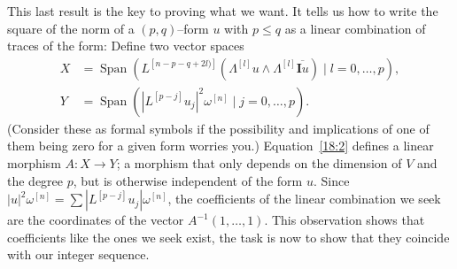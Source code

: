 \documentclass[11pt,a4paper]{amsart}
\def\^#1{^{[#1]}}
\def\I{\mathbf{I}}
\theoremstyle{definition}
\theoremstyle{remark}
\numberwithin{equation}{section}
\begin{document}
This last result is the key to proving what we want. It tells us how to
write the square of the norm of a $(p,q)$--form $u$ with $p \leq q$ as
a linear combination of traces of the form: Define two vector spaces
\begin{align*}
X &= \operatorname{Span}(L\^{n-p-q+2l)} 
(\Lambda\^l u \wedge \Lambda\^l \overline{\I u}) \mid l = 0,\ldots,p),
\\
Y &= \operatorname{Span}(|L\^{p-j}u_j|^2 \omega\^{n} \mid j=0,\ldots,p).
\end{align*}
(Consider these as formal symbols if the possibility and implications of
one of them being zero for a given form worries you.) Equation~\eqref{18:2}
defines a linear morphism $A : X \to Y$; a morphism that only depends
on the dimension of $V$ and the degree $p$, but is otherwise independent of
the form $u$. Since $|u|^2\omega\^n = \sum |L\^{p-j}u_j| \omega\^n$,  
the coefficients of the linear combination we seek are the coordinates of
the vector $A^{-1}(1,\ldots,1)$. This observation shows that coefficients
like the ones we seek exist, the task is now to show that they coincide
with our integer sequence.
\end{document}

